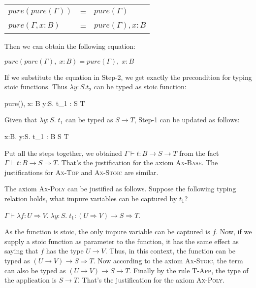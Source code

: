 \begin{center}
\begin{tabular}{l c l}
$pure(pure(\Gamma))$ & = & $pure(\Gamma)$ \\
$pure(\Gamma, x:B)$ & = & $pure(\Gamma), x:B$
\end{tabular}
\end{center}

Then we can obtain the following equation:

\begin{center}
  $pure(pure(\Gamma),\; x: B) = pure(\Gamma),\; x: B$
\end{center}

If we substitute the equation in Step-2, we get exactly the
precondition for typing stoic functions. Thus $\lambda y:S.t_2$ can be
typed as stoic function:

{ pure(\Gamma),\; x: B \vdash \lambda y:S. \; t_1 : S \to T }

Given that $\lambda y:S. \; t_1$ can be typed as $S \to T$, Step-1 can
be updated as follows:

{ \Gamma \vdash \lambda x:B. \lambda y:S. \; t_1 : B \to S \to T }

Put all the steps together, we obtained
$\Gamma \vdash t : B \to S \to T$ from the fact
$\Gamma \vdash t : B \to S \Rightarrow T$. That's the justification
for the axiom \textsc{Ax-Base}. The justifications for \textsc{Ax-Top}
and \textsc{Ax-Stoic} are similar.

The axiom \textsc{Ax-Poly} can be justified as follows. Suppose the
following typing relation holds, what impure variables can be captured
by $t_1$?

\begin{center}
  $\Gamma \vdash \lambda f:U \Rightarrow V. \; \lambda y:S. \; t_1 : (U
  \Rightarrow V) \to S \Rightarrow T$.
\end{center}

As the function is stoic, the only impure variable can be captured is
$f$. Now, if we supply a stoic function as parameter to the function,
it has the same effect as saying that $f$ has the type $U \to V$.
Thus, in this context, the function can be typed as
$(U \to V) \to S \Rightarrow T$.  Now according to the axiom
\textsc{Ax-Stoic}, the term can also be typed as
$(U \to V) \to S \to T$. Finally by the rule \textsc{T-App}, the type
of the application is $S \to T$. That's the justification for the
axiom \textsc{Ax-Poly}.

